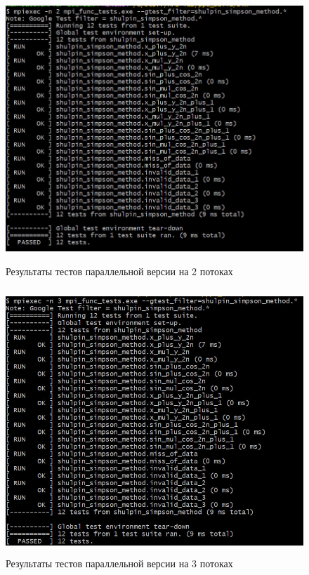 \documentclass[12pt,a4paper]{article}
\begin{document}
\begin{figure}[H]
\centering
\includegraphics[height=10cm]{img/2nmpitest.jpg}
\caption{\label{fig:visualClass} Результаты тестов параллельной версии на 2 потоках}
\end{figure}

\begin{figure}[H]
\centering
\includegraphics[height=10cm]{img/3nmpitest.jpg}
\caption{\label{fig:visualClass} Результаты тестов параллельной версии на 3 потоках}
\end{figure}
\end{document}
